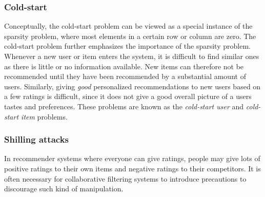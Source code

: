 \subsubsection{Cold-start}

Conceptually, the cold-start problem can be viewed as a special instance of the
sparsity problem, where most elements in a certain row or column are zero. The
cold-start problem further emphasizes the importance of the sparsity problem.
Whenever a new user or item enters the system, it is difficult to find similar
ones as there is little or no information available. New items can therefore
not be recommended until they have been recommended by a substantial amount of
users. Similarly, giving \emph{good} personalized recommendations to new users
based on a few ratings is difficult, since it does not give a good overall
picture of a users tastes and preferences. These problems are known as the
\emph{cold-start user} and \emph{cold-start item} problems.

\subsubsection{Shilling attacks}

In recommender systems where everyone can give ratings, people may give lots of
positive ratings to their own items and negative ratings to their competitors.
It is often necessary for collaborative filtering systems to introduce
precautions to discourage such kind of manipulation.
